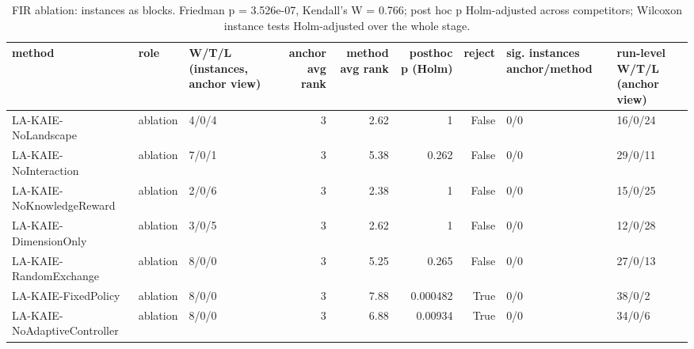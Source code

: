 \begin{table}[t]
\centering
\scriptsize
\caption{FIR ablation: instances as blocks. Friedman p = 3.526e-07, Kendall's W = 0.766; post hoc p Holm-adjusted across competitors; Wilcoxon instance tests Holm-adjusted over the whole stage.}
\label{tab:fir_ablation_global}
\begin{tabular}{lllrrrrll}
\toprule
method & role & W/T/L (instances, anchor view) & anchor avg rank & method avg rank & posthoc p (Holm) & reject & sig. instances anchor/method & run-level W/T/L (anchor view) \\
\midrule
LA-KAIE-NoLandscape & ablation & 4/0/4 & 3 & 2.62 & 1 & False & 0/0 & 16/0/24 \\
LA-KAIE-NoInteraction & ablation & 7/0/1 & 3 & 5.38 & 0.262 & False & 0/0 & 29/0/11 \\
LA-KAIE-NoKnowledgeReward & ablation & 2/0/6 & 3 & 2.38 & 1 & False & 0/0 & 15/0/25 \\
LA-KAIE-DimensionOnly & ablation & 3/0/5 & 3 & 2.62 & 1 & False & 0/0 & 12/0/28 \\
LA-KAIE-RandomExchange & ablation & 8/0/0 & 3 & 5.25 & 0.265 & False & 0/0 & 27/0/13 \\
LA-KAIE-FixedPolicy & ablation & 8/0/0 & 3 & 7.88 & 0.000482 & True & 0/0 & 38/0/2 \\
LA-KAIE-NoAdaptiveController & ablation & 8/0/0 & 3 & 6.88 & 0.00934 & True & 0/0 & 34/0/6 \\
\bottomrule
\end{tabular}
\end{table}
